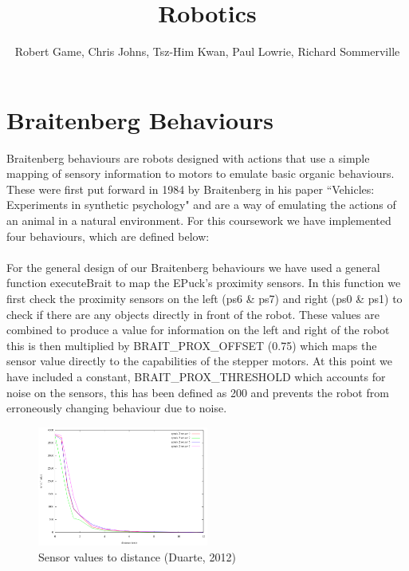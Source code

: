 \documentclass[11pt]{article}
\begin{document}
\title{Robotics}
\author{Robert Game, Chris Johns, Tsz-Him Kwan, Paul Lowrie, Richard Sommerville}
\date{}
\maketitle

\section*{Braitenberg Behaviours}

Braitenberg behaviours are robots designed with actions that use a simple mapping of sensory information to motors to emulate basic organic behaviours. These were first put forward in 1984 by Braitenberg in his paper “Vehicles: Experiments in synthetic psychology" and are a way of emulating the actions of an animal in a natural environment. For this coursework we have implemented four behaviours, which are defined below:
\\
\\
For the general design of our Braitenberg behaviours we have used a general function \- executeBrait to map the E\-Puck's proximity sensors. In this function we first check the proximity sensors on the left (ps6 \& ps7) and right (ps0 \& ps1) to check if there are any objects directly in front of the robot. These values are combined to produce a value for information on the left and right of the robot \- this is then multiplied by BRAIT\_PROX\_OFFSET (0.75) which maps the sensor value directly to the capabilities of the stepper motors. At this point we have included a constant, BRAIT\_PROX\_THRESHOLD which accounts for noise on the sensors, this has been defined as 200 and prevents the robot from erroneously changing behaviour due to noise.

\begin{figure}[h]
\begin{center}
\includegraphics[width=0.5\textwidth]{epuck-2-proximity.png}
\caption{Sensor values to distance (Duarte, 2012)}
\end{center}
\end{figure}
\end{document}
